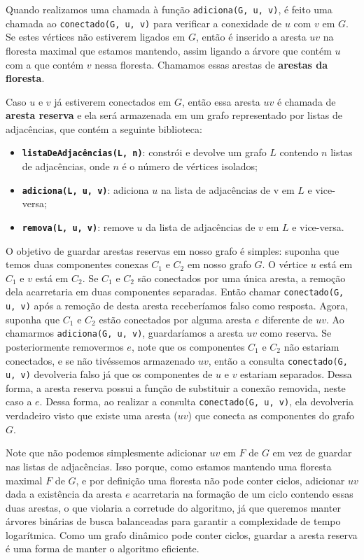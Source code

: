 Quando realizamos uma chamada à função \texttt{adiciona(G, u, v)}, é feito uma chamada ao \texttt{conectado(G, u, v)} para verificar a conexidade de $u$ com $v$ em $G$. Se estes vértices não estiverem ligados em $G$, então é inserido a aresta $uv$ na floresta maximal que estamos mantendo, assim ligando a árvore que contém $u$ com a que contém $v$ nessa floresta. Chamamos essas arestas de \textbf{arestas da floresta}.

Caso $u$ e $v$ já estiverem conectados em $G$, então essa aresta $uv$ é chamada de \textbf{aresta reserva} e ela será armazenada em um grafo representado por listas de adjacências, que contém a seguinte biblioteca:

\begin{itemize}
    \item \texttt{\textbf{listaDeAdjacências(L, n)}}: constrói e devolve um grafo $L$ contendo $n$ listas de adjacências, onde $n$ é o número de vértices isolados;
    \item \texttt{\textbf{adiciona(L, u, v)}}: adiciona $u$ na lista de adjacências de v em $L$ e vice-versa;
    \item \texttt{\textbf{remova(L, u, v)}}: remove $u$ da lista de adjacências de $v$ em $L$ e vice-versa.
\end{itemize} 

O objetivo de guardar arestas reservas em nosso grafo é simples: suponha que temos duas componentes conexas $C_1$ e $C_2$ em nosso grafo $G$. O vértice $u$ está em $C_1$ e $v$ está em $C_2$. Se $C_1$ e $C_2$ são conectados por uma única aresta, a remoção dela acarretaria em duas componentes separadas. Então chamar \texttt{conectado(G, u, v)} após a remoção de desta aresta receberíamos falso como resposta. Agora, suponha que $C_1$ e $C_2$ estão conectados por alguma aresta $e$ diferente de $uv$. Ao chamarmos \texttt{adiciona(G, u, v)}, guardaríamos a aresta $uv$ como reserva. Se posteriormente removermos $e$, note que os componentes $C_1$ e $C_2$ não estariam conectados, e se não tivéssemos armazenado $uv$, então a consulta \texttt{conectado(G, u, v)} devolveria falso já que os componentes de $u$ e $v$ estariam separados. Dessa forma, a aresta reserva possui a função de substituir a conexão removida, neste caso a $e$. Dessa forma, ao realizar a consulta \texttt{conectado(G, u, v)}, ela devolveria verdadeiro visto que existe uma aresta ($uv$) que conecta as componentes do grafo $G$.

Note que não podemos simplesmente adicionar $uv$ em $F$ de $G$ em vez de guardar nas listas de adjacências. Isso porque, como estamos mantendo uma floresta maximal $F$ de $G$, e por definição uma floresta não pode conter ciclos, adicionar $uv$ dada a existência da aresta $e$ acarretaria na formação de um ciclo contendo essas duas arestas, o que violaria a corretude do algoritmo, já que queremos manter árvores binárias de busca balanceadas para garantir a complexidade de tempo logarítmica. Como um grafo dinâmico pode conter ciclos, guardar a aresta reserva é uma forma de manter o algoritmo eficiente. 

